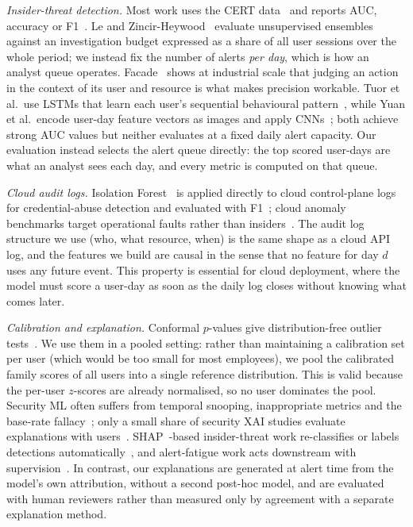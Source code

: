 \emph{Insider-threat detection.} Most work uses the CERT data~\cite{glasser2013bridging,lindauer2020cert}
and reports AUC, accuracy or F1~\cite{yuan2021deep,li2021image,tian2025scenarios}. Le and
Zincir-Heywood~\cite{le2021ensembles} evaluate unsupervised ensembles against an investigation
budget expressed as a share of all user sessions over the whole period; we instead fix the number
of alerts \emph{per day}, which is how an analyst queue operates. Facade~\cite{kantchelian2024facade}
shows at industrial scale that judging an action in the context of its user and resource is what
makes precision workable. Tuor et al.\ use LSTMs that learn each user's sequential behavioural
pattern~\cite{yuan2021deep}, while Yuan et al.\ encode user-day feature vectors as images and apply
CNNs~\cite{li2021image}; both achieve strong AUC values but neither evaluates at a fixed daily
alert capacity. Our evaluation instead selects the alert queue directly: the top \B{} scored
user-days are what an analyst sees each day, and every metric is computed on that queue.

\emph{Cloud audit logs.} Isolation Forest~\cite{liu2008isolation} is applied directly to cloud
control-plane logs for credential-abuse detection and evaluated with F1~\cite{haunschild2026devsecops};
cloud anomaly benchmarks target operational faults rather than insiders~\cite{zou2025cloudanobench}.
The audit log structure we use (who, what resource, when) is the same shape as a cloud API log,
and the features we build are causal in the sense that no feature for day $d$ uses any future
event. This property is essential for cloud deployment, where the model must score a user-day as
soon as the daily log closes without knowing what comes later.

\emph{Calibration and explanation.} Conformal $p$-values give distribution-free outlier
tests~\cite{bates2023conformal}. We use them in a pooled setting: rather than maintaining a
calibration set per user (which would be too small for most employees), we pool the calibrated
family scores of all users into a single reference distribution. This is valid because the
per-user $z$-scores are already normalised, so no user dominates the pool.
Security ML often suffers from temporal snooping, inappropriate
metrics and the base-rate fallacy~\cite{arp2022dos}; only a small share of security XAI studies
evaluate explanations with users~\cite{nadeem2023sok}. SHAP~\cite{lundberg2017shap}-based
insider-threat work re-classifies or labels detections
automatically~\cite{grzeczkowicz2025xai,faqihi2026shap}, and alert-fatigue work acts downstream with
supervision~\cite{ndichu2026pact}. In contrast, our explanations are generated at alert time from
the model's own attribution, without a second post-hoc model, and are evaluated with human
reviewers rather than measured only by agreement with a separate explanation method.

